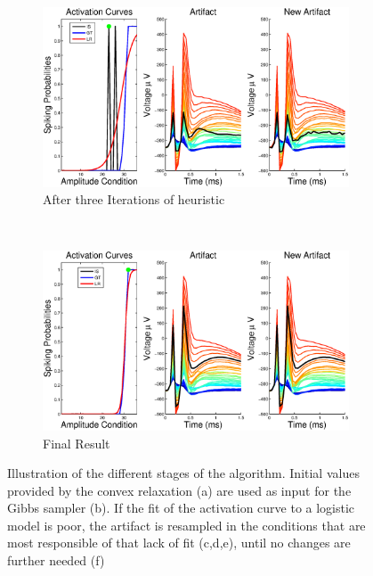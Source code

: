 \documentclass[12pt,letterpaper,fleqn]{article}
\begin{document}
\begin{figure}[ht!]
        
        \begin{subfigure}[b]{0.5\textwidth}
                \includegraphics[width=\textwidth]{i4.eps}
                \caption{After three Iterations of heuristic}
        \end{subfigure}~
         \begin{subfigure}[b]{0.5\textwidth}
                \includegraphics[width=\textwidth]{i6.eps}
                \caption{Final Result}
                \label{fig:mouse}
        \end{subfigure}
\caption{Illustration of the different stages of the algorithm. Initial values provided by the convex relaxation (a) are used as input for the Gibbs sampler (b). If the fit of the activation curve to a logistic model is poor, the artifact is resampled in the conditions that are most responsible of that lack of fit (c,d,e), until no changes are further needed (f)}
\end{figure}
\end{document}
